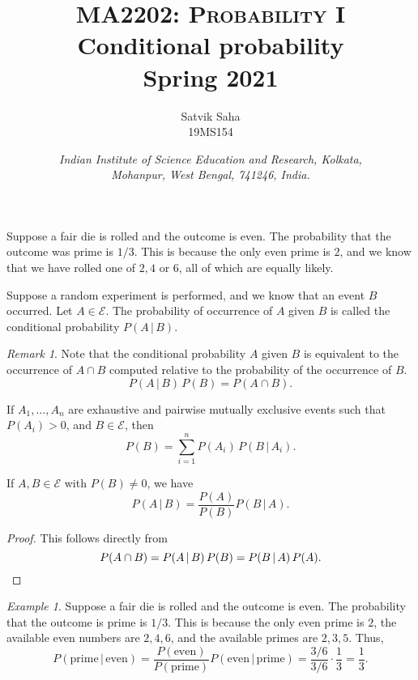 \documentclass[11pt]{article}
\title{
    \Large\textsc{MA2202: Probability I} \\
    \Huge \textbf{Conditional probability} \\
    \vspace{5pt}
    \Large{Spring 2021}
}
\author{
    \large Satvik Saha%
    \\\textsc{\small 19MS154}
}
\date{\normalsize
    \textit{Indian Institute of Science Education and Research, Kolkata, \\
    Mohanpur, West Bengal, 741246, India.} \\
}
\theoremstyle{definition}
\theoremstyle{remark}
\newtheorem*{remark}{Remark}
\newtheorem*{example}{Example}
\numberwithin{equation}{module}
\begin{document}
    \maketitle

    Suppose a fair die is rolled and the outcome is even. The probability that the
    outcome was prime is $1 /3$. This is because the only even prime is $2$, and we
    know that we have rolled one of $2, 4$ or $6$, all of which are equally likely.
    \begin{definition}
        Suppose a random experiment is performed, and we know that an event $B$
        occurred. Let $A \in \mathcal{E}$. The probability of occurrence of $A$
        given $B$ is called the conditional probability $P(A \,|\, B)$.

        \begin{remark}
            Note that the conditional probability $A$ given $B$ is equivalent to the
            occurrence of $A \cap B$ computed relative to the probability of the
            occurrence of $B$. \[
                P(A\,|\, B) \,P(B) = P(A \cap B).
            \] 
        \end{remark}
    \end{definition}

    \begin{lemma}
        If $A_1, \dots, A_n$ are exhaustive and pairwise mutually exclusive events
        such that $P(A_i) > 0$, and $B \in \mathcal{E}$, then \[
            P(B) = \sum_{i = 1}^n P(A_i) \, P(B \,|\, A_i).
        \] 
    \end{lemma}

    \begin{theorem}
        If $A, B \in \mathcal{E}$ with $P(B) \neq 0$, we have \[
            P(A \,|\, B) = \frac{P(A)}{P(B)}P(B \,|\, A).
        \]
    \end{theorem}
    \begin{proof}
        This follows directly from \[
            P(A \cap B) = P(A \,|\, B) \,P(B) = P(B \,|\, A) \,P(A). \qedhere
        \] 
    \end{proof}
    \begin{example}
        Suppose a fair die is rolled and the outcome is even. The probability that
        the outcome is prime is $1 /3$. This is because the only even prime is $2$,
        the available even numbers are $2, 4, 6$, and the available primes are 
        $2, 3, 5$. Thus, \[
            P(\text{prime} \,|\, \text{even}) =
            \frac{P(\text{even})}{P(\text{prime})} P(\text{even} \,|\, \text{prime})
            = \frac{3 / 6}{3 / 6} \cdot \frac{1}{3} = \frac{1}{3}.
        \] 
    \end{example}
\end{document}

